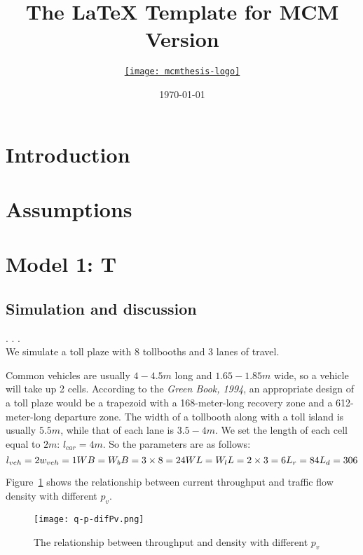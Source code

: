 \documentclass{mcmthesis}
\title{The \LaTeX{} Template for MCM Version \MCMversion}
\author{\small \href{http://www.latexstudio.net/}
  {\texttt{[image: mcmthesis-logo]}}}
\date{\today}
\begin{document}
\section{Introduction}
\section{Assumptions}
\section{Model 1: T}
\subsection{Simulation and discussion}
.
.
.
\\
We simulate a toll plaze with 8 tollbooths and 3 lanes of travel.

Common vehicles are usually $4-4.5m$ long and $1.65-1.85m$ wide,
so a vehicle will take up 2 cells.
According to the \emph{Green Book, 1994}, an appropriate design of
a toll plaze would be a trapezoid with a
168-meter-long recovery zone and a 612-meter-long departure zone.
The width of a tollbooth along with a toll island
is usually $5.5m$, while that of each lane is $3.5-4m$.
We set the length of each cell equal to $2m$: $l_{car}=4m$.
So the parameters are as follows:
\[
{l}_{veh}=2\\
{w}_{veh}=1\\
WB={W}_{b}B=3\times8=24\\
WL={W}_{l}L=2\times3=6\\
{L}_{r}=84\\
{L}_{d}=306\\
\]

Figure~\ref{fig:q-p} shows the relationship between current throughput and
traffic flow density with different ${p}_{v}$.

\begin{figure}[h]
\small
\centering
\texttt{[image: q-p-difPv.png]}
\caption{The relationship between throughput and density with different ${p}_{v}$}
 \label{fig:q-p}

\end{figure}
\end{document}
